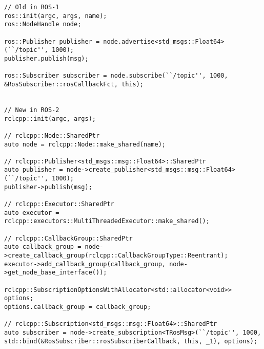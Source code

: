 \lstset{language=[ISO]C++}
\begin{lstlisting}[label=code:cpp-api-modes, caption={[Nodes, Subscriptions, Publisher]The base of subscriptions, pulishers, callback-groups, ... are Nodes. Each Object also has a ::SharedPtr type, which should be used instead of a reference or a manually handled pointer.}]
// Old in ROS-1
ros::init(argc, args, name);
ros::NodeHandle node;

ros::Publisher publisher = node.advertise<std_msgs::Float64>(``/topic'', 1000);
publisher.publish(msg);

ros::Subscriber subscriber = node.subscribe(``/topic'', 1000, &RosSubscriber::rosCallbackFct, this);


// New in ROS-2
rclcpp::init(argc, args);

// rclcpp::Node::SharedPtr
auto node = rclcpp::Node::make_shared(name);

// rclcpp::Publisher<std_msgs::msg::Float64>::SharedPtr
auto publisher = node->create_publisher<std_msgs::msg::Float64>(``/topic'', 1000);
publisher->publish(msg);

// rclcpp::Executor::SharedPtr
auto executor = rclcpp::executors::MultiThreadedExecutor::make_shared();

// rclcpp::CallbackGroup::SharedPtr
auto callback_group = node->create_callback_group(rclcpp::CallbackGroupType::Reentrant);
executor->add_callback_group(callback_group, node->get_node_base_interface());

rclcpp::SubscriptionOptionsWithAllocator<std::allocator<void>> options;
options.callback_group = callback_group;

// rclcpp::Subscription<std_msgs::msg::Float64>::SharedPtr
auto subscriber = node->create_subscription<TRosMsg>(``/topic'', 1000, std::bind(&RosSubscriber::rosSubscriberCallback, this, _1), options);
\end{lstlisting}




